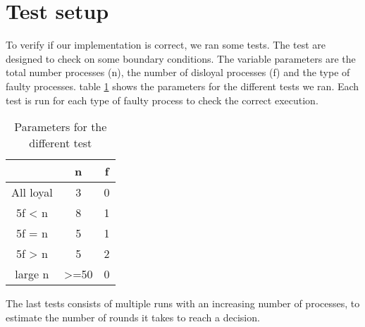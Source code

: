 \section{Test setup}

To verify if our implementation is correct, we ran some tests.
The test are designed to check on some boundary conditions.
The variable parameters are the total number processes (n), the number of disloyal processes (f) and the type of faulty processes.
table \ref{table:Tests} shows the parameters for the different tests we ran. Each test is run for each type of faulty process to check the correct execution.

\begin{table}[h]
	\begin{tabular}{ | c | c  | c  | }
		\hline
  		& n & f \\
		\hline
 		All loyal &  3 & 0  \\
		\hline
  		5f < n  & 8 & 1  \\
		\hline
		5f = n & 5 & 1 \\
		\hline
		5f > n & 5 & 2 \\
		\hline
		large n  & >=50 & 0 \\
		\hline
	\end{tabular}
	\caption{Parameters for the different test}	
	\label{table:Tests}
\end{table}

The last tests consists of multiple runs with an increasing number of processes, to estimate the number of rounds it takes to reach a decision.